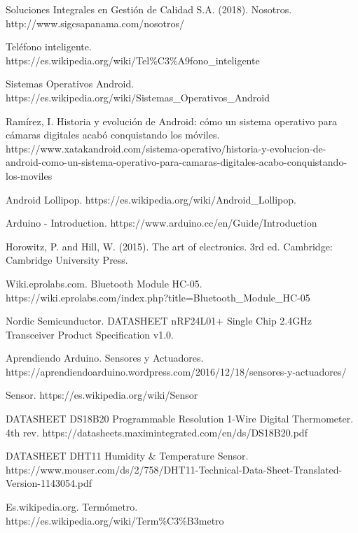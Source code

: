 \begin{thebibliography}{9}

Soluciones Integrales en Gestión de Calidad S.A. (2018). Nosotros. http://www.sigcsapanama.com/nosotros/

Teléfono inteligente.\\ https://es.wikipedia.org/wiki/Tel\%C3\%A9fono\_inteligente

Sistemas Operativos Android.\\ https://es.wikipedia.org/wiki/Sistemas\_Operativos\_Android

Ramírez, I. Historia y evolución de Android: cómo un sistema operativo para cámaras digitales acabó conquistando los móviles.  https://www.xatakandroid.com/sistema-operativo/historia-y-evolucion-de-android-como-un-sistema-operativo-para-camaras-digitales-acabo-conquistando-los-moviles

Android Lollipop. https://es.wikipedia.org/wiki/Android\_Lollipop.

Arduino - Introduction.  https://www.arduino.cc/en/Guide/Introduction

Horowitz, P. and Hill, W. (2015). The art of electronics. 3rd ed. Cambridge: Cambridge University Press.

Wiki.eprolabs.com. Bluetooth Module HC-05. https://wiki.eprolabs.com/index.php?title=Bluetooth\_Module\_HC-05 

Nordic Semicunductor. DATASHEET nRF24L01+ Single Chip 2.4GHz Transceiver Product Specification v1.0.

Aprendiendo Arduino. Sensores y Actuadores. https://aprendiendoarduino.wordpress.com/2016/12/18/sensores-y-actuadores/

Sensor. https://es.wikipedia.org/wiki/Sensor

DATASHEET DS18B20 Programmable Resolution 1-Wire Digital Thermometer. 4th rev. https://datasheets.maximintegrated.com/en/ds/DS18B20.pdf

DATASHEET DHT11 Humidity \& Temperature Sensor. https://www.mouser.com/ds/2/758/DHT11-Technical-Data-Sheet-Translated-Version-1143054.pdf

Es.wikipedia.org. Termómetro.\\ https://es.wikipedia.org/wiki/Term\%C3\%B3metro
 

\end{thebibliography}
